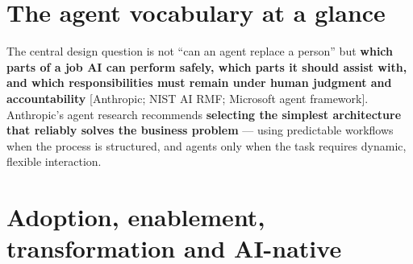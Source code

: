 \section{The agent vocabulary at a glance}

\begin{center}
\end{center}

The central design question is not ``can an agent replace a person'' but
\textbf{which parts of a job AI can perform safely, which parts it should
assist with, and which responsibilities must remain under human judgment and
accountability} [Anthropic; NIST AI RMF; Microsoft agent framework].
Anthropic's agent research recommends \textbf{selecting the simplest
architecture that reliably solves the business problem} — using predictable
workflows when the process is structured, and agents only when the task
requires dynamic, flexible interaction.

\section{Adoption, enablement, transformation and AI-native}

